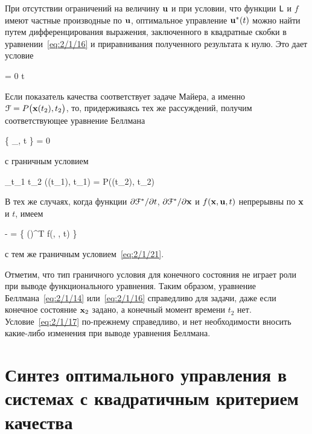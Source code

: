 При отсутствии ограничений на величину $\mathbf{u}$ и при условии, что функции $\mathsf{L}$ и $f$ имеют частные производные по $\mathbf{u}$, оптимальное управление ${\mathbf{u}^{*}}(t)$ можно найти путем дифференцирования выражения, заключенного в квадратные скобки в уравнении~\ref{eq:2/1/16} и приравнивания полученного результата к нулю. Это дает условие

    \biggl[ \partdiff{\funcL}{\m{u}} + \sum\limits_{i=1}^n \partdiff{\optF}{\m{x}_i} \emptyarg \partdiff{f_i}{\m{u}} \biggr] = 0  t \in [t_1, t_2] 
\eeq

Если показатель качества соответствует задаче Майера, а именно $\mathcal{F} = P\bigl( \mathbf{x}(t_2), t_2 \bigr)$, то, придерживаясь тех же рассуждений, получим соответствующее уравнение Беллмана

     \Biggl\{ _{, t} \Biggr\} = 0
\eeq

с граничным условием

    \lim_{t_1 \to t_2} \optF\bigl((t_1), t_1\bigr) = P\bigl((t_2), t_2\bigr) 
\eeq

В тех же случаях, когда функции $\partial {    \mathcal{F}  ^{*}  } / \partial {t}$, $\partial {    \mathcal{F}  ^{*}  } / \partial {  \mathbf{x}  }$ и $f(\mathbf{x}, \mathbf{u}, t)$ непрерывны по $\mathbf{x}$ и $t$, имеем

    -  =  \Biggl\{ \biggl(\biggr)^T f(, , t) \Biggr\}
\eeq

с тем же граничным условием~\ref{eq:2/1/21}.

\br

Отметим, что тип граничного условия для конечного состояния не играет роли при выводе функционального уравнения. Таким образом, уравнение Беллмана~\ref{eq:2/1/14} или~\vref{eq:2/1/16} справедливо для задачи, даже если конечное состояние $\mathbf{x}_2$ задано, а конечный момент времени $t_2$ нет. Условие~\vref{eq:2/1/17} по-прежнему справедливо, и нет необходимости вносить какие-либо изменения при выводе уравнения Беллмана.



\section{Синтез оптимального управления в системах с квадратичным критерием качества}



